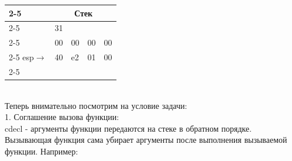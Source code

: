 \documentclass[12pt, letterpaper]{article}
\begin{document}
        \begin{minipage}{\textwidth}
        \begin{tabular}{l|l|l|l|l|}
        \cline{2-5}
        &\multicolumn{4}{c|}{Стек}\\
        \cline{2-5}
        &31& & &\\
        \cline{2-5}
        &00&00&00&00\\
        \cline{2-5}
        esp$\longrightarrow$ &40&e2&01&00\\
        \cline{2-5}
    \end{tabular}
\end{minipage}
\\

Теперь внимательно посмотрим на условие задачи:\\
1. Соглашение вызова функции:\\
cdecl - аргументы функции передаются на стеке в обратном порядке. Вызывающая функция сама убирает аргументы после выполнения вызываемой функции. Например:\\
\end{document}
